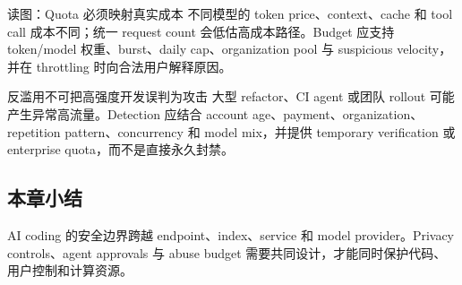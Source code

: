 
\begin{knowledgebox}{读图：Quota 必须映射真实成本}
不同模型的 token price、context、cache 和 tool call 成本不同；统一 request count 会低估高成本路径。Budget 应支持 token/model 权重、burst、daily cap、organization pool 与 suspicious velocity，并在 throttling 时向合法用户解释原因。
\end{knowledgebox}

\begin{warningbox}{反滥用不可把高强度开发误判为攻击}
大型 refactor、CI agent 或团队 rollout 可能产生异常高流量。Detection 应结合 account age、payment、organization、repetition pattern、concurrency 和 model mix，并提供 temporary verification 或 enterprise quota，而不是直接永久封禁。
\end{warningbox}


\subsection{本章小结}

AI coding 的安全边界跨越 endpoint、index、service 和 model provider。Privacy controls、agent approvals 与 abuse budget 需要共同设计，才能同时保护代码、用户控制和计算资源。

